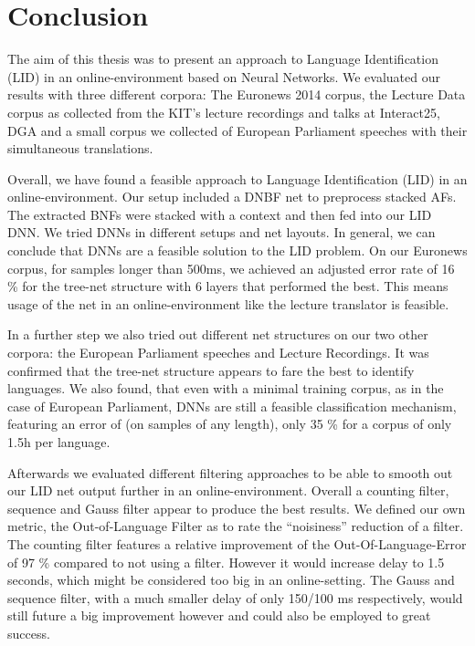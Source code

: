 
\chapter{Conclusion}
\label{ch:Conclusion}

The aim of this thesis was to present an approach to Language Identification (LID) in an online-environment based on Neural Networks. We evaluated our results with three different corpora: The Euronews 2014 corpus, the Lecture Data corpus as collected from the KIT's lecture recordings and talks at Interact25, DGA and a small corpus we collected of European Parliament speeches with their simultaneous translations.

Overall, we have found a feasible approach to Language Identification (LID) in an online-environment. Our setup included a DNBF net to preprocess stacked AFs. The extracted BNFs were stacked with a context and then fed into our LID DNN.  We tried DNNs in different setups and net layouts. In general, we can conclude that DNNs are a feasible solution to the LID problem. On our Euronews corpus, for samples longer than 500ms, we achieved an adjusted error rate of 16 \% for the tree-net structure with 6 layers that performed the best. This means usage of the net in an online-environment like the lecture translator is feasible.

In a further step we also tried out different net structures on our two other corpora: the European Parliament speeches and Lecture Recordings. It was confirmed that the tree-net structure appears to fare the best to identify languages. We also found, that even with a minimal training corpus, as in the case of European Parliament, DNNs are still a feasible classification mechanism, featuring an error of (on samples of any length), only 35 \% for a corpus of only 1.5h per language. 

Afterwards we evaluated different filtering approaches to be able to smooth out our LID net output further in an online-environment. Overall a counting filter, sequence and Gauss filter appear to produce the best results. We defined our own metric, the Out-of-Language Filter as to rate the ``noisiness'' reduction of a filter. The counting filter features a relative improvement of the Out-Of-Language-Error of 97 \% compared to not using a filter. However it would increase delay to 1.5 seconds, which might be considered too big in an online-setting. The Gauss and sequence filter, with a much smaller delay of only 150/100 ms respectively, would still future a big improvement however and could also be employed to great success.

